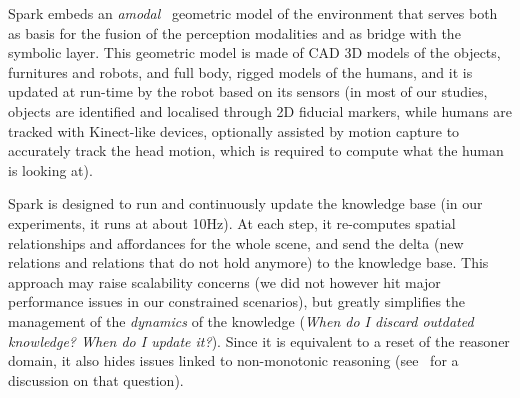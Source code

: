 \documentclass[preprint,3p,times]{elsarticle}
\begin{document}
{\sc Spark} embeds an \emph{amodal}~\cite{Mavridis2006} geometric model of the
environment that serves both as basis for the fusion of the perception
modalities and as bridge with the symbolic layer. This geometric model is made
of CAD 3D models of the objects, furnitures and robots, and full body, rigged
models of the humans, and it is updated at run-time by the robot based on its
sensors (in most of our studies, objects are identified and localised through 2D
fiducial markers, while humans are tracked with Kinect-like devices, optionally
assisted by motion capture to accurately track the head motion, which is
required to compute what the human is looking at).



{\sc Spark} is designed to run and continuously update the knowledge base (in
our experiments, it runs at about 10Hz). At each step, it re-computes spatial
relationships and affordances for the whole scene, and send the delta (new
relations and relations that do not hold anymore) to the knowledge base. This
approach may raise scalability concerns (we did not however hit major
performance issues in our constrained scenarios), but greatly simplifies the
management of the \emph{dynamics} of the knowledge (\emph{When do I discard
outdated knowledge?  When do I update it?}). Since it is equivalent to a reset
of the reasoner domain, it also hides issues linked to non-monotonic reasoning
(see~\cite{McCarthy2007} for a discussion on that question).
\end{document}
